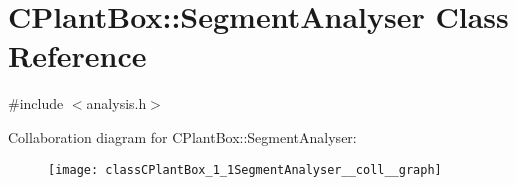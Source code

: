 \hypertarget{classCPlantBox_1_1SegmentAnalyser}{}\section{C\+Plant\+Box\+:\+:Segment\+Analyser Class Reference}
\label{classCPlantBox_1_1SegmentAnalyser}


{\ttfamily \#include $<$analysis.\+h$>$}



Collaboration diagram for C\+Plant\+Box\+:\+:Segment\+Analyser\+:\nopagebreak
\begin{figure}[H]
\begin{center}
\leavevmode
\texttt{[image: classCPlantBox\_1\_1SegmentAnalyser\_\_coll\_\_graph]}
\end{center}
\end{figure}
